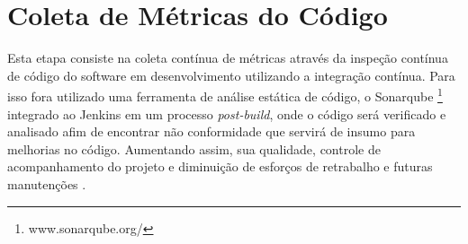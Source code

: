 \section{Coleta de Métricas do Código}
Esta etapa consiste na coleta contínua de métricas através da inspeção contínua de código do software em desenvolvimento utilizando a integração contínua. Para isso fora utilizado uma ferramenta de análise estática de código, o Sonarqube \footnote{www.sonarqube.org/} integrado ao Jenkins em um processo \textit{post-build}, onde o código será verificado e analisado afim de encontrar não conformidade que servirá de insumo para melhorias no código. Aumentando assim, sua qualidade, controle de acompanhamento do projeto e diminuição de esforços de retrabalho e futuras manutenções . 
